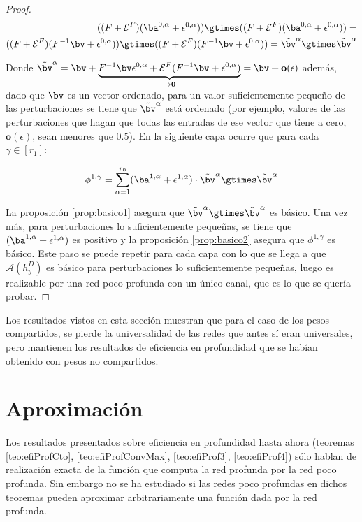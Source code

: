 \begin{proof}
\begin{align*}
((F+\mathcal{E}^F)(\ba^{0,\alpha}+\epsilon^{0,\alpha}))\gtimes((F+\mathcal{E}^F)(\ba^{0,\alpha}+\epsilon^{0,\alpha})) = \\
((F+\mathcal{E}^F)( F^{-1}\bv+\epsilon^{0,\alpha}))\gtimes((F+\mathcal{E}^F)( F^{-1}\bv+\epsilon^{0,\alpha})) = \tilde{\bv}^\alpha \gtimes \tilde{\bv}^\alpha
\end{align*}

Donde $\tilde{\bv}^\alpha = \bv + \underbrace{F^{-1}\bv \epsilon^{0,\alpha} +  \mathcal{E}^F ( F^{-1}\bv+\epsilon^{0,\alpha})}_{\rightarrow \mathbf{0}} = \bv + \textbf{o}(\epsilon)$ además, dado que $\bv$ es un vector ordenado, para un valor suficientemente pequeño de las perturbaciones se tiene que $\tilde{\bv}^\alpha$ está ordenado (por ejemplo, valores de las perturbaciones que hagan que todas las entradas de ese vector que tiene  a cero, $\textbf{o}(\epsilon)$, sean menores que $0.5$). En la siguiente capa ocurre que para cada $\gamma \in [r_1]$:

\begin{align*}
\phi^{1,\gamma} = \sum^{r_0}_{\alpha=1} (\ba^{1,\alpha}+\epsilon^{1,\alpha}) \cdot  \tilde{\bv}^\alpha \gtimes \tilde{\bv}^\alpha
\end{align*}


La proposición \ref{prop:basico1} asegura que $\tilde{\bv}^\alpha \gtimes \tilde{\bv}^\alpha$ es básico. Una vez más, para perturbaciones lo suficientemente pequeñas, se tiene que $(\ba^{1,\alpha}+\epsilon^{1,\alpha})$ es positivo y la proposición \ref{prop:basico2} asegura que $\phi^{1,\gamma}$ es básico. Este paso se puede repetir para cada capa con lo que se llega a que $\mathcal{A}(h^D_y)$ es básico para perturbaciones lo suficientemente pequeñas, luego es realizable por una red poco profunda con un único canal, que es lo que se quería probar.
\end{proof}


Los resultados vistos en esta sección muestran que para el caso de los pesos compartidos, se pierde la universalidad de las redes que antes sí eran universales, pero mantienen los resultados de eficiencia en profundidad que se habían obtenido con pesos no compartidos.

\section{Aproximación}


Los resultados presentados sobre eficiencia en profundidad hasta ahora (teoremas \ref{teo:efiProfCto}, \ref{teo:efiProfConvMax}, \ref{teo:efiProf3}, \ref{teo:efiProf4}) sólo hablan de realización exacta de la función que computa la red profunda por la red poco profunda. Sin embargo no se ha estudiado si las redes poco profundas en dichos teoremas pueden aproximar arbitrariamente una función dada por la red profunda.

